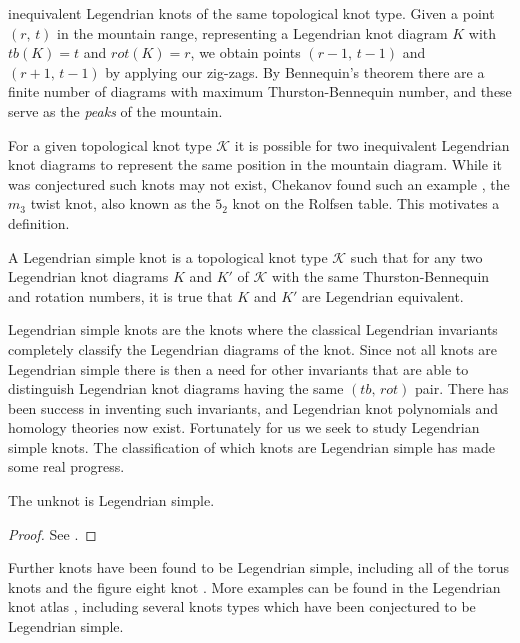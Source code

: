    inequivalent Legendrian knots of the same topological knot type. Given
    a point $(r,\,t)$ in the mountain range, representing a Legendrian knot
    diagram $K$ with $tb(K)=t$ and $rot(K)=r$, we obtain points
    $(r-1,\,t-1)$ and $(r+1,\,t-1)$ by applying our zig-zags. By
    Bennequin's theorem there are a finite number of diagrams with
    maximum Thurston-Bennequin number, and these serve as the
    \textit{peaks} of the mountain.
    \par\hfill\par
    For a given topological knot type $\mathcal{K}$ it is possible for two
    inequivalent Legendrian knot diagrams to represent the same position in
    the mountain diagram. While it was conjectured such knots may not exist,
    Chekanov found such an example \cite{ChekanovDifAlgOfLegLinks},
    the $m_{3}$ twist knot, also known as the $5_{2}$ knot on the Rolfsen
    table. This motivates a definition.
    \begin{definition}
        A Legendrian simple knot is a topological knot type $\mathcal{K}$
        such that for any two Legendrian knot diagrams $K$ and $K'$ of
        $\mathcal{K}$ with the same Thurston-Bennequin and rotation numbers,
        it is true that $K$ and $K'$ are Legendrian equivalent.
    \end{definition}
    Legendrian simple knots are the knots where the classical Legendrian
    invariants completely classify the Legendrian diagrams of the knot. Since
    not all knots are Legendrian simple there is then a need for other
    invariants that are able to distinguish Legendrian knot diagrams having
    the same $(tb,\,rot)$ pair. There has been success in inventing such
    invariants, and Legendrian knot polynomials and homology theories now
    exist. Fortunately for us we seek to study Legendrian simple knots. The
    classification of which knots are Legendrian simple has made some real
    progress.
    \begin{theorem}
        The unknot is Legendrian simple.
    \end{theorem}
    \begin{proof}
        See \cite{EliashbergFraserClassificationTopTrivialLegKnots}.
    \end{proof}
    Further knots have been found to be Legendrian simple, including all of the
    torus knots and the figure eight knot \cite{EtnyreHondaContactTopologyI}.
    More examples can be found in the Legendrian knot atlas
    \cite{LegendrianKnotAtlas}, including several knots types which have been
    conjectured to be Legendrian simple.
